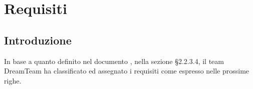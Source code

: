 \section{Requisiti}

\subsection{Introduzione}
In base a quanto definito nel documento \textit{\NdP}, nella sezione §2.2.3.4, il team DreamTeam ha classificato ed assegnato i requisiti come espresso nelle prossime righe.

